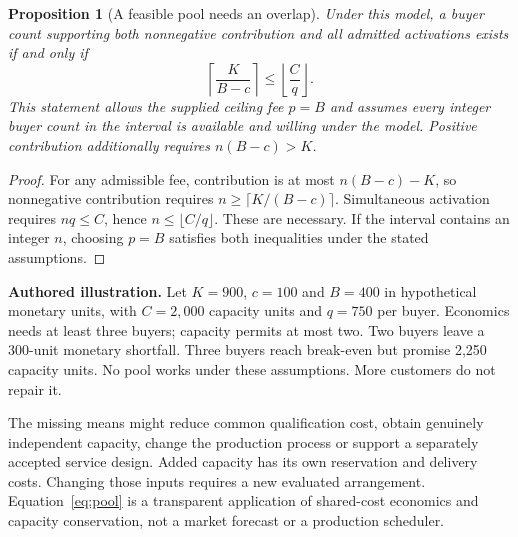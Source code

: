 \documentclass[11pt,a4paper]{article}
\newtheorem{proposition}{Proposition}
\begin{document}
\begin{proposition}[A feasible pool needs an overlap]
Under this model, a buyer count supporting both nonnegative contribution and all admitted activations exists if and only if
\begin{equation}
\left\lceil\frac{K}{B-c}\right\rceil
\leq
\left\lfloor\frac{C}{q}\right\rfloor.
\label{eq:pool}
\end{equation}
This statement allows the supplied ceiling fee $p=B$ and assumes every integer buyer count in the interval is available and willing under the model. Positive contribution additionally requires $n(B-c)>K$.
\end{proposition}
\begin{proof}
For any admissible fee, contribution is at most $n(B-c)-K$, so nonnegative contribution requires $n\geq\lceil K/(B-c)\rceil$. Simultaneous activation requires $nq\leq C$, hence $n\leq\lfloor C/q\rfloor$. These are necessary. If the interval contains an integer $n$, choosing $p=B$ satisfies both inequalities under the stated assumptions.\end{proof}

\textbf{Authored illustration.} Let $K=900$, $c=100$ and $B=400$ in hypothetical monetary units, with $C=2{,}000$ capacity units and $q=750$ per buyer. Economics needs at least three buyers; capacity permits at most two. Two buyers leave a 300-unit monetary shortfall. Three buyers reach break-even but promise 2,250 capacity units. No pool works under these assumptions. More customers do not repair it.

The missing means might reduce common qualification cost, obtain genuinely independent capacity, change the production process or support a separately accepted service design. Added capacity has its own reservation and delivery costs. Changing those inputs requires a new evaluated arrangement. Equation~\eqref{eq:pool} is a transparent application of shared-cost economics and capacity conservation, not a market forecast or a production scheduler.
\end{document}
